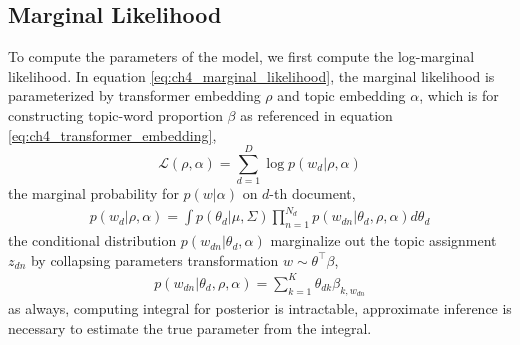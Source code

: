\subsection{Marginal Likelihood}
To compute the parameters of the model, we first compute the log-marginal likelihood. In equation \ref{eq:ch4_marginal_likelihood}, the marginal likelihood is parameterized by transformer embedding $ \rho $ and topic embedding $ \alpha $, which is for constructing topic-word proportion $ \beta $ as referenced in equation \ref{eq:ch4_transformer_embedding},
\begin{equation}\label{eq:ch4_marginal_likelihood}
\mathcal{L}(\rho,\alpha)=\sum_{d=1}^{D}\log p(w_d|\rho,\alpha)
\end{equation}
the marginal probability for $ p(w|\alpha) $ on $ d $-th document,
\begin{align}
p(w_d|\rho,\alpha)=\int p(\theta_d|\mu,\Sigma)\prod_{n=1}^{N_d}p(w_{dn}|\theta_d,\rho,\alpha)d\theta_d
\end{align}
the conditional distribution $ p(w_{dn}|\theta_d,\alpha) $ marginalize out the topic assignment $ z_{dn} $ by collapsing parameters transformation $ w\sim \theta^\top\beta $,
\begin{align}
p(w_{dn}|\theta_d,\rho,\alpha)=\sum_{k=1}^{K}\theta_{dk}\beta_{k,w_{dn}}
\end{align}
as always, computing integral for posterior is intractable, approximate inference is necessary to estimate the true parameter from the integral.

